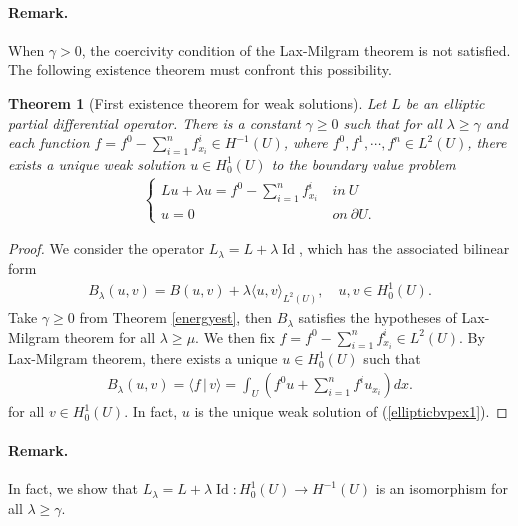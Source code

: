 \documentclass{article}
\numberwithin{equation}{section}
\DeclareMathOperator{\id}{Id}
\theoremstyle{plain}
\newtheorem{theorem}{Theorem}[section]
\theoremstyle{definition}
\begin{document}
\paragraph{Remark.} When $\gamma>0$, the coercivity condition of the Lax-Milgram theorem is not satisfied. The following existence theorem must confront this possibility.

\begin{theorem}[First existence theorem for weak solutions]\label{ellipex1}
Let $L$ be an elliptic partial differential operator. There is a constant $\gamma\geq 0$ such that for all $\lambda\geq\gamma$ and each function $f=f^0-\sum_{i=1}^n f^i_{x_i}\in H^{-1}(U)$, where $f^0,f^1,\cdots,f^n\in L^2(U)$, there exists a unique weak solution $u\in H_0^1(U)$ to the boundary value problem
\begin{align}
\begin{cases}
	Lu+\lambda u = f^0-\sum_{i=1}^n f^i_{x_i}\ &in\ U\\
	u=0\ &on\ \partial U.
\end{cases}\label{ellipticbvpex1}
\end{align}
\end{theorem}
\begin{proof}
We consider the operator $L_\lambda=L+\lambda\id$, which has the associated bilinear form
\begin{align*}
	B_\lambda(u,v)=B(u,v)+\lambda\langle u,v\rangle_{L^2(U)},\quad u,v\in H_0^1(U).
\end{align*}
Take $\gamma\geq 0$ from Theorem \ref{energyest}, then $B_\lambda$ satisfies the hypotheses of Lax-Milgram theorem for all $\lambda\geq\mu$. We then fix $f=f^0-\sum_{i=1}^n f^i_{x_i}\in L^2(U)$. By Lax-Milgram theorem, there exists a unique $u\in H_0^1(U)$ such that
\begin{align*}
	B_\lambda(u,v)=\langle f\,|\,v\rangle=\int_U\left(f^0u+\sum_{i=1}^n f^i u_{x_i}\right)dx.
\end{align*}
for all $v\in H_0^1(U)$. In fact, $u$ is the unique weak solution of (\ref{ellipticbvpex1}).
\end{proof}
\paragraph{Remark.} In fact, we show that $L_\lambda=L+\lambda\id:H_0^1(U)\to H^{-1}(U)$ is an isomorphism for all $\lambda\geq\gamma$.
\end{document}
